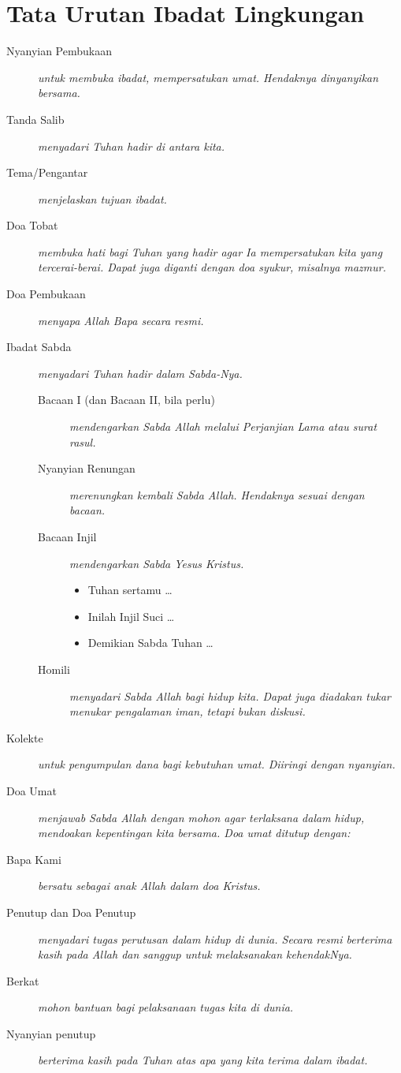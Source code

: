 \newpage
\section{Tata Urutan Ibadat Lingkungan}

\begin{description}
\item [Nyanyian Pembukaan]
      {\it untuk membuka ibadat, mempersatukan umat.  Hendaknya dinyanyikan bersama.}
\item [Tanda Salib]
		{\it menyadari Tuhan hadir di antara kita.}
\item [Tema/Pengantar]
		{\it menjelaskan tujuan ibadat.}	
		
\item [Doa Tobat]
		{\it membuka hati bagi Tuhan yang hadir agar Ia mempersatukan kita yang tercerai-berai. Dapat juga diganti dengan doa syukur, misalnya mazmur.}
		
\item [Doa Pembukaan]
		{\it menyapa Allah Bapa secara resmi.}
		
\item [Ibadat Sabda]
		{\it menyadari Tuhan hadir dalam Sabda-Nya.}
		\begin{description}
		\item [Bacaan I (dan Bacaan II, bila perlu)]
				{\it mendengarkan Sabda Allah melalui Perjanjian Lama atau surat rasul.}
		\item [Nyanyian Renungan]
				{\it merenungkan kembali Sabda Allah. Hendaknya sesuai dengan bacaan.}
		\item [Bacaan Injil]
				{\it mendengarkan Sabda Yesus Kristus.
				\begin{itemize}
				\item Tuhan sertamu \dots
				\item Inilah Injil Suci \dots
				\item Demikian Sabda Tuhan \dots
				\end{itemize}
				}
		\item [Homili]
				{\it menyadari Sabda Allah bagi hidup kita. Dapat juga diadakan tukar menukar pengalaman iman, tetapi bukan diskusi.}
		\end{description}				

\item [Kolekte]
		{\it untuk pengumpulan dana bagi kebutuhan umat. Diiringi dengan nyanyian.}
\item [Doa Umat]
		{\it menjawab Sabda Allah dengan mohon agar terlaksana dalam hidup, mendoakan kepentingan kita bersama. Doa umat ditutup dengan:}
\item [Bapa Kami]
		{\it bersatu sebagai anak Allah dalam doa Kristus.}
\item [Penutup dan Doa Penutup]
		{\it menyadari tugas perutusan dalam hidup di dunia. Secara resmi berterima kasih pada Allah dan sanggup untuk melaksanakan kehendakNya.}
\item [Berkat]
		{\it mohon bantuan bagi pelaksanaan tugas kita di dunia.}
\item [Nyanyian penutup]				
		{\it berterima kasih pada Tuhan atas apa yang kita terima dalam ibadat.}
\end{description}